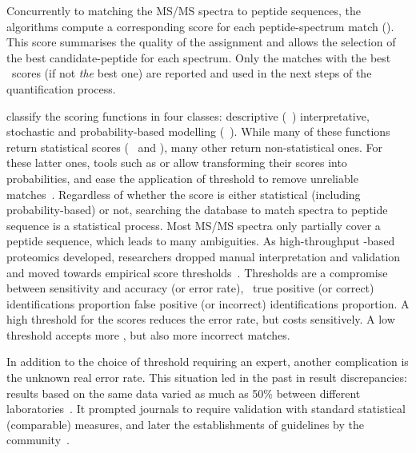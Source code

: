 
Concurrently to matching the \gls{MS/MS} spectra to peptide sequences,
the algorithms compute a corresponding score for each peptide-spectrum match (\psm).
This score summarises the quality of the assignment
and allows the selection of the best candidate-peptide for each spectrum.
Only the matches with the best \psm\ scores (if not \emph{the} best one)
are reported and used in the next steps of the quantification process.

\citet{Sadygov2004-nl} classify the scoring functions in four classes:
descriptive (\eg\ )
interpretative, stochastic and probability-based modelling (\eg\ ).
While many of these functions return statistical scores
(\eg\  and ),
many other return non-statistical ones.
For these latter ones,
tools such as 
or 
allow transforming their scores into probabilities,
and ease the application of threshold to remove unreliable matches~.
Regardless of whether the score is either statistical (including probability-based) or not,
searching the database to match spectra to peptide sequence is a statistical process.
Most \gls{MS/MS} spectra only partially cover a peptide sequence,
which leads to many ambiguities.
As high-throughput \ms-based proteomics developed,
researchers dropped manual interpretation and validation
and moved towards empirical score thresholds~.
Thresholds are a compromise between sensitivity and accuracy (or error rate),
\ie\ true positive (or correct) identifications proportion
 false positive (or incorrect) identifications proportion.
A high threshold for the scores reduces the error rate, but costs sensitively.
A low threshold accepts more \psms, but also more incorrect matches.

In addition to the choice of threshold requiring an expert,
another complication is the unknown real error rate.
This situation led in the past in result discrepancies:
results based on the same data varied
as much as 50\% between different laboratories~.
It prompted journals to require validation
with standard statistical (comparable) measures,
and later the establishments of guidelines by the
community~.

